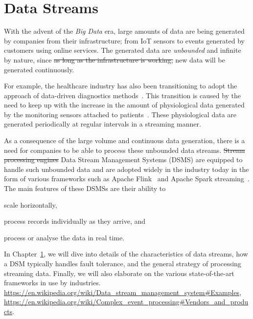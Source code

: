 \chapter{Data Streams} 
\label{chap:data_stream_processing}
With the advent of the \emph{Big Data} era, large amounts of data are being generated 
by companies from their infrastructure; from IoT sensors to events 
generated by customers using online services.
The generated data 
are \emph{unbounded} and infinite by nature, since \sout{as long 
as the infrastructure is working, }new data will be generated continuously. 

For example, the healthcare industry has also been transitioning to 
adopt the approach of data-driven diagnostics methods~\cite{hospital_diagnosis}. 
This transition is caused by the need to keep up with the increase in the amount 
of physiological data generated by the monitoring sensors attached to
patients~\cite{hospital_data_monitoring}. These physiological data are generated 
periodically at regular intervals
in a streaming manner. 

As a consequence of the large volume and continuous data generation, there is a need for 
companies to be able to process these unbounded data streams.
\sout{Stream processing engines} Data Stream Management Systems (DSMS)
 are equipped to handle such unbounded data and are adopted 
widely in the industry today in the form of various frameworks such as Apache Flink~\cite{flink} and 
Apache Spark streaming~\cite{spark_streaming}.
The main features of these DSMSs are their ability to 
\renewcommand{\labelenumi}{(\roman{enumi})}
\begin{enumerate*}
    \item scale horizontally, 
    \item process records individually as they arrive, and
    \item process or analyse the data in real time.
\end{enumerate*}

In Chapter~\ref{chap:data_stream_processing}, we will dive into details of 
the characteristics of data streams, how a DSM typically handles fault tolerance, and
the general strategy of processing streaming data. Finally, we will also elaborate on the 
various state-of-the-art frameworks in use by industries.
\url{https://en.wikipedia.org/wiki/Data_stream_management_system#Examples},
\url{https://en.wikipedia.org/wiki/Complex_event_processing#Vendors_and_products}.

